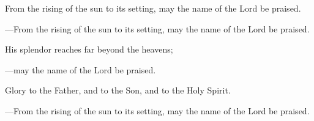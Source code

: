 \responsory
\begin{hangpar}

From the rising of the sun to its setting,
may the name of the Lord be praised.

{\color{red}---\thinspace}From the rising of the sun to its setting,
may the name of the Lord be praised.

\medskip His splendor reaches far beyond the heavens;

{\color{red}---\thinspace}may the name of the Lord be praised.

\medskip Glory to the Father, and to the Son, and to the Holy Spirit.

{\color{red}---\thinspace}From the rising of the sun to its setting,
may the name of the Lord be praised.
\end{hangpar}

